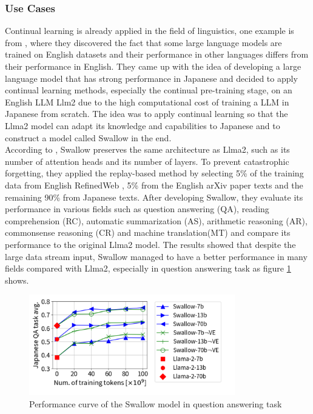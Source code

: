 \documentclass[runningheads]{llncs}
\begin{document}
\subsubsection{Use Cases}
\noindent \newline
Continual learning is already applied in the field of linguistics, one example is from \cite{Fujii24}, where they discovered the fact that some large language models are trained on English datasets and their performance 
in other languages differs from their performance in English. They came up with the idea of developing a large language model that has strong performance in Japanese and decided to apply continual learning methods, especially 
the continual pre-training stage, on an English LLM Llm2 due to the high computational cost of training a LLM in Japanese from scratch. The idea was to apply continual learning so that the Llma2 model can adapt its knowledge 
and capabilities to Japanese and to construct a model called Swallow in the end. \\
\noindent \newline
According to \cite{Fujii24}, Swallow preserves the same architecture as Llma2, such as its number of attention heads and its number of layers. To prevent catastrophic forgetting, they applied the replay-based method
by selecting 5\% of the training data from English RefinedWeb \cite{Penedo23}, 5\% from the English arXiv paper texts and the remaining 90\% from Japanese texts. After developing Swallow, they evaluate its performance in various fields such
as question answering (QA), reading comprehension (RC), automatic summarization (AS), arithmetic reasoning (AR), commonsense reasoning (CR) and machine translation(MT) and compare its performance to the original Llma2 model.
The results showed that despite the large data stream input, Swallow managed to have a better performance in many fields compared with Llma2, especially in question answering task as figure \ref{fig:swallow} shows.
\begin{figure}[htbp]
  \centering
  \includegraphics[width=0.8\textwidth]{swallow.png}
  \caption{Performance curve of the Swallow model in question answering task \cite{Fujii24}}
  \label{fig:swallow}
\end{figure}
\end{document}
